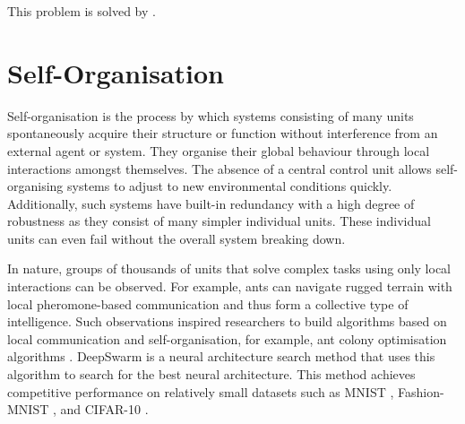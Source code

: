 This problem is solved by .







\section{Self-Organisation}
Self-organisation is the process by which systems consisting of many units spontaneously acquire their structure or function without interference from an external agent or system.
They organise their global behaviour through local interactions amongst themselves.
The absence of a central control unit allows self-organising systems to adjust to new environmental conditions quickly.
Additionally, such systems have built-in redundancy with a high degree of robustness as they consist of many simpler individual units.
These individual units can even fail without the overall system breaking down.

In nature, groups of thousands of units that solve complex tasks using only local interactions can be observed.
For example, ants can navigate rugged terrain with local pheromone-based communication and thus form a collective type of intelligence.
Such observations inspired researchers to build algorithms based on local communication and self-organisation, for example, ant colony optimisation algorithms .
DeepSwarm  is a neural architecture search method that uses this algorithm to search for the best neural architecture.
This method achieves competitive performance on relatively small datasets such as MNIST \cite{lecun_gradient-based_1998}, Fashion-MNIST \cite{xiao2017/online}, and CIFAR-10 \cite{krizhevsky_learning_2009}.


